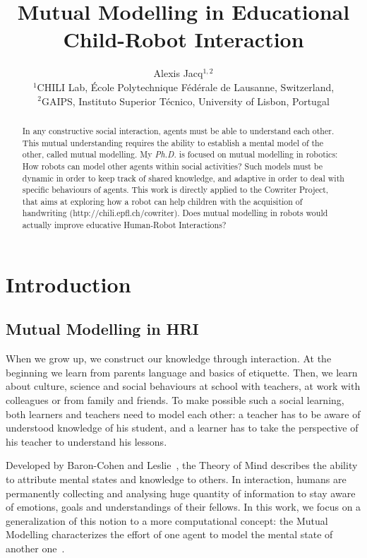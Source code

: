 \documentclass[10pt,a4paper,twocolumn]{article}
\begin{document}
\title{Mutual Modelling in Educational Child-Robot Interaction}


\author{Alexis Jacq$^{1,2}$\\
$^1$CHILI Lab, \'Ecole Polytechnique F\'ed\'erale de Lausanne, Switzerland,\\
$^2$GAIPS, Instituto Superior T\'{e}cnico, University of Lisbon, Portugal}




\maketitle
\begin{abstract}
In any constructive social interaction, agents must be able to understand each other. This mutual understanding requires the ability to establish a mental model of the other, called mutual modelling. My \textit{Ph.D.} is focused on mutual modelling in robotics: How robots can model other agents within social activities? Such models must be dynamic in order to keep track of shared knowledge, and adaptive in order to deal with specific behaviours of agents. 
This work is directly applied to the Cowriter Project, that aims at exploring how a robot can help children with the acquisition of handwriting (http://chili.epfl.ch/cowriter). Does mutual modelling in robots would actually improve educative Human-Robot Interactions?
\end{abstract}

\section{Introduction}
\subsection{Mutual Modelling in HRI}

When we grow up, we construct our knowledge through interaction. At the beginning we learn from parents language and basics of etiquette. Then, we learn about culture, science and social behaviours at school with teachers, at work with colleagues or from family and friends. To make possible such a social learning, both learners and teachers need to model each other: a teacher has to be aware of understood knowledge of his student, and a learner has to take the perspective of his teacher to understand his lessons. 

Developed by Baron-Cohen and Leslie~\cite{baron1985does}, the Theory of Mind describes the ability to attribute mental states and knowledge to others. In interaction, humans are permanently collecting and analysing huge quantity of information to stay aware of emotions, goals and understandings of their fellows. In this work, we focus on a generalization of this notion to a more computational concept: the Mutual Modelling characterizes the effort of one agent to model the mental state of another one~\cite{dillenbourg1999you}. 
\end{document}
